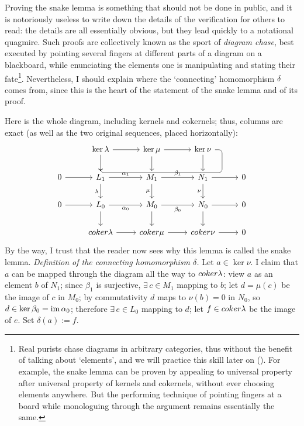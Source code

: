 Proving the snake lemma is something that should not be done in
public, and it is notoriously useless to write down the details of the
verification for others to read: the details are all essentially
obvious, but they lead quickly to a notational quagmire. Such proofs
are collectively known as the sport of \emph{diagram chase}, best
executed by pointing several fingers at different parts of a diagram
on a blackboard, while enunciating the elements one is manipulating
and stating their fate\footnote{Real purists chase diagrams in
  arbitrary categories, thus without the benefit of talking about
  `elements', and we will practice this skill later on
  (). For example, the snake lemma can be proven by
  appealing to universal property after universal property of kernels
  and cokernels, without ever choosing elements anywhere. But the
  performing technique of pointing fingers at a board while
  monologuing through the argument remains essentially the
  same.}. Nevertheless, I should explain where the `connecting'
homomorphism $\delta$ comes from, since this is the heart of the
statement of the snake lemma and of its proof.

Here is the whole diagram, including kernels and cokernels; thus,
columns are exact (as well as the two original sequences, placed
horizontally):
\[\begin{tikzcd}
    & \ker\lambda \arrow[r] \arrow[d] & \ker\mu \arrow[r] \arrow[d] & \ker\nu \arrow[d] \arrow[dll, "\delta", rounded corners, to path={ -- ([xshift=2ex]\tikztostart.east) |- ([yshift=-0.5ex]\tikztotarget.north) -- (\tikztotarget)}] \\
    0 \arrow[r] & L_1 \arrow[r, "\alpha_1"] \arrow[d, "\lambda"'] & M_1 \arrow[r, "\beta_1"] \arrow[d, "\mu"'] & N_1 \arrow[r] \arrow[d, "\nu"'] & 0 \\
    0 \arrow[r] & L_0 \arrow[r, "\alpha_0"'] \arrow[d] & M_0 \arrow[r, "\beta_0"'] \arrow[d] & N_0 \arrow[r] \arrow[d] & 0 \\
    & \coker\lambda \arrow[r] & \coker\mu \arrow[r] & \coker\nu
    \arrow[r] & 0
  \end{tikzcd}\] By the way, I trust that the reader now sees why this
lemma is called the snake lemma.  \emph{Definition of the connecting
  homomorphism $\delta$.} Let $a \in \ker\nu$. I claim that $a$ can be
mapped through the diagram all the way to $coker\lambda$: view $a$ as
an element $b$ of $N_1$; since $\beta_1$ is surjective,
$\exists\, c \in M_1$ mapping to $b$; let $d = \mu(c)$ be the image of
$c$ in $M_0$; by commutativity $d$ maps to $\nu(b) = 0$ in $N_0$, so
$d \in \ker\beta_0 = \operatorname{im}\alpha_0$; therefore $\exists\, e \in L_0$
mapping to $d$; let $f \in coker\lambda$ be the image of $e$. Set
$\delta(a) := f$.

